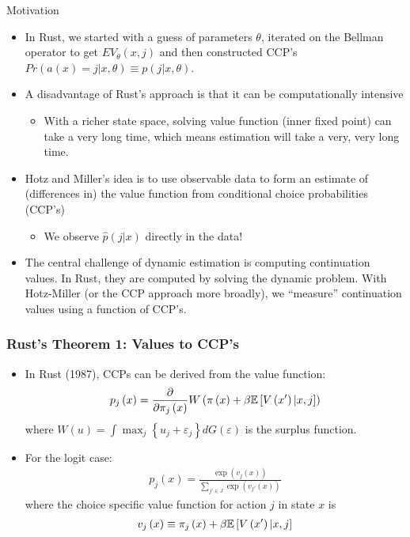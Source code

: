 \begin{frame}{Motivation}
\begin{itemize}
	\item In Rust, we started with a guess of parameters $\theta$, iterated on the Bellman operator to get $EV_{\theta}(x,j)$ and then constructed CCP's $Pr(a(x) = j | x,\theta) \equiv p(j | x,\theta)$.
	\item A disadvantage of Rust's approach is that it can be computationally intensive
	\begin{itemize}
		\item With a richer state space, solving value function (inner fixed point) 
		can take a very long time,
		which means estimation will take a very, very long time.
	\end{itemize}
	\item Hotz and Miller's idea is to use observable data to form an estimate 
	of (differences in) the value function from conditional choice probabilities (CCP's)
\begin{itemize}
\item We observe $\hat{p}(j | x)$ directly in the data!
\end{itemize}
	\item The central challenge of dynamic estimation is computing continuation values. 
	In Rust, they are computed by solving the dynamic problem.
	With Hotz-Miller (or the CCP approach more broadly), we ``measure'' continuation
	values using a function of CCP's.
	
\end{itemize}
\end{frame}

\begin{frame}
\frametitle{Rust's Theorem 1: Values to CCP's}
\begin{itemize}
	\item In Rust (1987), CCPs can be derived from the value function:
	\begin{align*}
		p_{j}\left( x\right) = \frac{\partial}{\partial \pi_{j} \left(x \right)} W\left( \pi\left( x \right) 
		+\beta \mathbb{E}\left[V\left(x' \right)|x,j\right]\right)
	\end{align*}
	where  
	$W\left(u\right) = \int \max_{j} \left\{ u_{j} +\varepsilon_{j}\right\}dG\left( \varepsilon\right)$
	is the surplus function.
	\medskip
	\item For the logit case:
	\begin{align*}
	p_{j}\left(x\right) = \frac{\exp\left(v_{j}\left(x\right)\right)}{\sum_{j'\in J}\exp\left(v_{j'}\left(x\right)\right)}
	\end{align*}
	where the choice specific value function for action $j$ in state $x$ is 
	\begin{align*}
	v_{j}\left(x\right) \equiv \pi_{j}\left(x\right)+\beta \mathbb{E}\left[V\left(x' \right)|x,j\right]
	\end{align*}
\end{itemize}
\end{frame}


